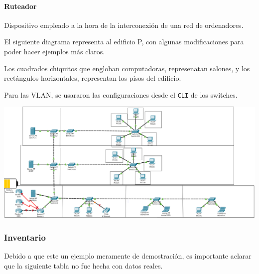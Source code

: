 \documentclass[spanish,12pt,letterpaper]{article}
\begin{document}
\paragraph{Ruteador} Dispositivo empleado a la hora de la interconexión de una
red de ordenadores.

El siguiente diagrama representa al edificio P, con algunas modificaciones para
poder hacer ejemplos más claros.

Los cuadrados chiquitos que engloban computadoras, represenatan salones, y los
rectángulos horizontales, representan los pisos del edificio.

Para las VLAN, se usararon las configuraciones desde el \texttt{CLI} de los
switches.

\begin{center}
  \includegraphics[scale=.28]{nuevoP.png}
\end{center}

\subsubsection{Inventario}
Debido a que este un ejemplo meramente de demostración, es importante aclarar que
la siguiente tabla no fue hecha con datos reales.
\end{document}
